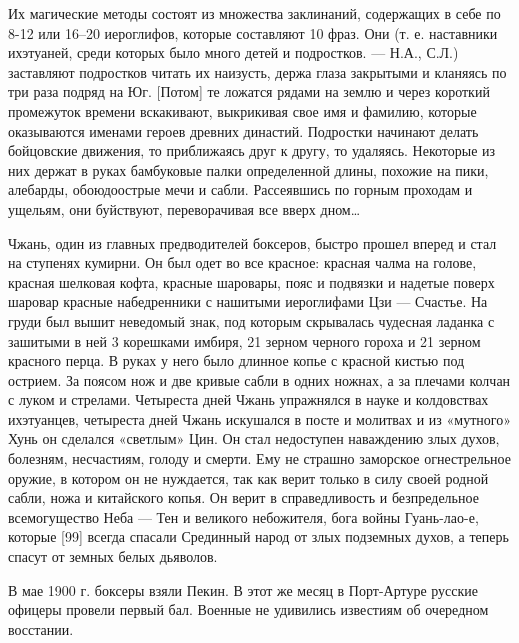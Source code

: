 \begin{textcitation}
Их магические методы состоят из множества заклинаний, содержащих в себе по 8-12 или 16–20 иероглифов, которые составляют 10 фраз. Они (т. е. наставники ихэтуаней, среди которых было много детей и подростков. — Н.А., С.Л.) заставляют подростков читать их наизусть, держа глаза закрытыми и кланяясь по три раза подряд на Юг. [Потом] те ложатся рядами на землю и через короткий промежуток времени вскакивают, выкрикивая свое имя и фамилию, которые оказываются именами героев древних династий. Подростки начинают делать бойцовские движения, то приближаясь друг к другу, то удаляясь. Некоторые из них держат в руках бамбуковые палки определенной длины, похожие на пики, алебарды, обоюдоострые мечи и сабли. Рассеявшись по горным проходам и ущельям, они буйствуют, переворачивая все вверх дном…
\end{textcitation}
\begin{textcitation}
Чжань, один из главных предводителей боксеров, быстро прошел вперед и стал на ступенях кумирни. Он был одет во все красное: красная чалма на голове, красная шелковая кофта, красные шаровары, пояс и подвязки и надетые поверх шаровар красные набедренники с нашитыми иероглифами Цзи — Счастье. На груди был вышит неведомый знак, под которым скрывалась чудесная ладанка с зашитыми в ней 3 корешками имбиря, 21 зерном черного гороха и 21 зерном красного перца. В руках у него было длинное копье с красной кистью под острием. За поясом нож и две кривые сабли в одних ножнах, а за плечами колчан с луком и стрелами.
Четыреста дней Чжань упражнялся в науке и колдовствах ихэтуанцев, четыреста дней Чжань искушался в посте и молитвах и из «мутного» Хунь он сделался «светлым» Цин. Он стал недоступен наваждению злых духов, болезням, несчастиям, голоду и смерти. Ему не страшно заморское огнестрельное оружие, в котором он не нуждается, так как верит только в силу своей родной сабли, ножа и китайского копья.
Он верит в справедливость и безпредельное всемогущество Неба — Тен и великого небожителя, бога войны Гуань-лао-е, которые [99] всегда спасали Срединный народ от злых подземных духов, а теперь спасут от земных белых дьяволов.
\end{textcitation}

В мае 1900 г. боксеры взяли Пекин. В этот же месяц в Порт-Артуре русские офицеры провели первый бал. Военные не удивились известиям об очередном восстании.

